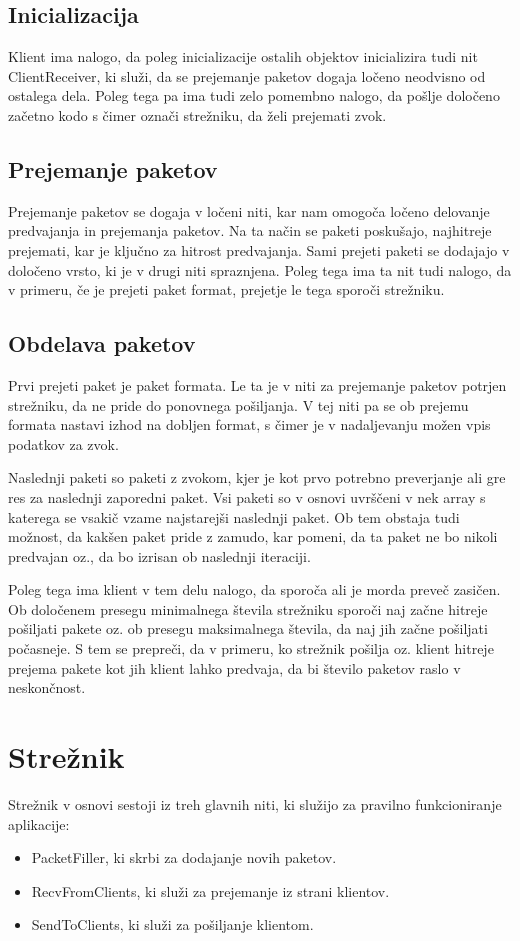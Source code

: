 \documentclass[journal]{IEEEtran}
\begin{document}
\subsection{Inicializacija}
Klient ima nalogo, da poleg inicializacije ostalih objektov inicializira tudi nit ClientReceiver, ki služi, da se prejemanje paketov dogaja ločeno neodvisno od ostalega dela. Poleg tega pa ima tudi zelo pomembno nalogo, da pošlje določeno začetno kodo s čimer označi strežniku, da želi prejemati zvok.

\subsection{Prejemanje paketov}
Prejemanje paketov se dogaja v ločeni niti, kar nam omogoča ločeno delovanje predvajanja in prejemanja paketov. Na ta način se paketi poskušajo, najhitreje prejemati, kar je ključno za hitrost predvajanja. Sami prejeti paketi se dodajajo v določeno vrsto, ki je v drugi niti spraznjena. Poleg tega ima ta nit tudi nalogo, da v primeru, če je prejeti paket format, prejetje le tega sporoči strežniku.

\subsection{Obdelava paketov}
Prvi prejeti paket je paket formata. Le ta je v niti za prejemanje paketov potrjen strežniku, da ne pride do ponovnega pošiljanja. V tej niti pa se ob prejemu formata nastavi izhod na dobljen format, s čimer je v nadaljevanju možen vpis podatkov za zvok.

Naslednji paketi so paketi z zvokom, kjer je kot prvo potrebno preverjanje ali gre res za naslednji zaporedni paket. Vsi paketi so v osnovi uvrščeni v nek array s katerega se vsakič vzame najstarejši naslednji paket. Ob tem obstaja tudi možnost, da kakšen paket pride z zamudo, kar pomeni, da ta paket ne bo nikoli predvajan oz., da bo izrisan ob naslednji iteraciji.

Poleg tega ima klient v tem delu nalogo, da sporoča ali je morda preveč zasičen. Ob določenem presegu minimalnega števila strežniku sporoči naj začne hitreje pošiljati pakete oz. ob presegu maksimalnega števila, da naj jih začne pošiljati počasneje. S tem se prepreči, da v primeru, ko strežnik pošilja oz. klient hitreje prejema pakete kot jih klient lahko predvaja, da bi število paketov raslo v neskončnost.


\section{Strežnik}
Strežnik v osnovi sestoji iz treh glavnih niti, ki služijo za pravilno funkcioniranje aplikacije:
\begin{itemize}
	\item PacketFiller, ki skrbi za dodajanje novih paketov.
	\item RecvFromClients, ki služi za prejemanje iz strani klientov.
	\item SendToClients, ki služi za pošiljanje klientom.
\end{itemize}
\end{document}
